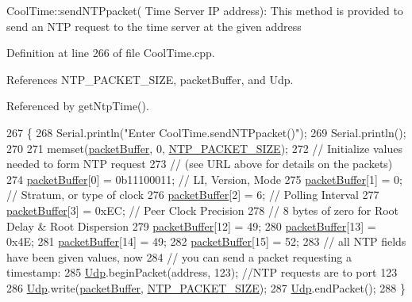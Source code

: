 Cool\+Time\+::send\+N\+T\+Ppacket( Time Server I\+P address)\+: This method is provided to send an N\+TP request to the time server at the given address 

Definition at line 266 of file Cool\+Time.\+cpp.



References N\+T\+P\+\_\+\+P\+A\+C\+K\+E\+T\+\_\+\+S\+I\+ZE, packet\+Buffer, and Udp.



Referenced by get\+Ntp\+Time().


\begin{DoxyCode}
267 \{
268     Serial.println(\textcolor{stringliteral}{"Enter CoolTime.sendNTPpacket()"});
269     Serial.println();
270 
271     memset(\hyperlink{classCoolTime_a27e6abc82a5c2f72161956967005bec7}{packetBuffer}, 0, \hyperlink{CoolTime_8h_a56a6ea64006651b4f42adf713e244f06}{NTP\_PACKET\_SIZE});
272     \textcolor{comment}{// Initialize values needed to form NTP request}
273     \textcolor{comment}{// (see URL above for details on the packets)}
274     \hyperlink{classCoolTime_a27e6abc82a5c2f72161956967005bec7}{packetBuffer}[0] = 0b11100011;   \textcolor{comment}{// LI, Version, Mode}
275     \hyperlink{classCoolTime_a27e6abc82a5c2f72161956967005bec7}{packetBuffer}[1] = 0;     \textcolor{comment}{// Stratum, or type of clock}
276     \hyperlink{classCoolTime_a27e6abc82a5c2f72161956967005bec7}{packetBuffer}[2] = 6;     \textcolor{comment}{// Polling Interval}
277     \hyperlink{classCoolTime_a27e6abc82a5c2f72161956967005bec7}{packetBuffer}[3] = 0xEC;  \textcolor{comment}{// Peer Clock Precision}
278     \textcolor{comment}{// 8 bytes of zero for Root Delay & Root Dispersion}
279     \hyperlink{classCoolTime_a27e6abc82a5c2f72161956967005bec7}{packetBuffer}[12]  = 49;
280     \hyperlink{classCoolTime_a27e6abc82a5c2f72161956967005bec7}{packetBuffer}[13]  = 0x4E;
281     \hyperlink{classCoolTime_a27e6abc82a5c2f72161956967005bec7}{packetBuffer}[14]  = 49;
282     \hyperlink{classCoolTime_a27e6abc82a5c2f72161956967005bec7}{packetBuffer}[15]  = 52;
283     \textcolor{comment}{// all NTP fields have been given values, now}
284     \textcolor{comment}{// you can send a packet requesting a timestamp:                 }
285     \hyperlink{classCoolTime_a4e23216a8121ca79d0fb019f30884b92}{Udp}.beginPacket(address, 123); \textcolor{comment}{//NTP requests are to port 123}
286     \hyperlink{classCoolTime_a4e23216a8121ca79d0fb019f30884b92}{Udp}.write(\hyperlink{classCoolTime_a27e6abc82a5c2f72161956967005bec7}{packetBuffer}, \hyperlink{CoolTime_8h_a56a6ea64006651b4f42adf713e244f06}{NTP\_PACKET\_SIZE});
287     \hyperlink{classCoolTime_a4e23216a8121ca79d0fb019f30884b92}{Udp}.endPacket(); 
288 \}
\end{DoxyCode}
